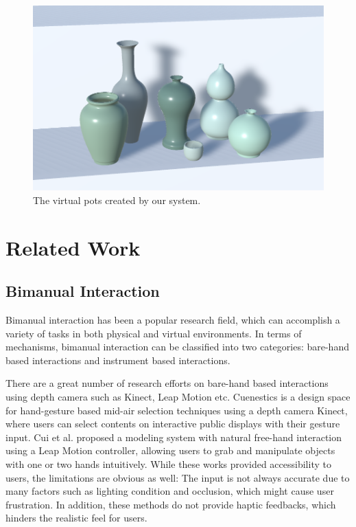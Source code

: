 \documentclass{svjour3}                     %
\begin{document}
\begin{figure}
\includegraphics[width=\textwidth]{pots.png}
\caption{The virtual pots created by our system.}
\label{fig:1}
\end{figure}


\section{Related Work}
\label{sec:2}

\subsection{Bimanual Interaction}
\label{sec:2.1}
Bimanual interaction has been a popular research field, which can accomplish a variety of tasks in both physical and virtual environments.
In terms of mechanisms, bimanual interaction can be classified into two categories: bare-hand based interactions and instrument based interactions.

There are a great number of research efforts \cite{walter2014cuenesics,cui2016exploration,ramani2015gesture,murugappan2013handy,han2014virtual} on bare-hand based interactions using depth camera such as Kinect, Leap Motion etc.
Cuenestics \cite{walter2014cuenesics} is a design space for hand-gesture based mid-air selection techniques using a depth camera Kinect, where users can select contents on interactive public displays with their gesture input.
Cui et al. \cite{cui2016exploration} proposed a modeling system with natural free-hand interaction using a Leap Motion controller, allowing users to grab and manipulate objects with one or two hands intuitively.
While these works provided accessibility to users, the limitations are obvious as well: The input is not always accurate due to many factors such as lighting condition and occlusion, which might cause user frustration.
In addition, these methods do not provide haptic feedbacks, which hinders the realistic feel for users.
\end{document}
